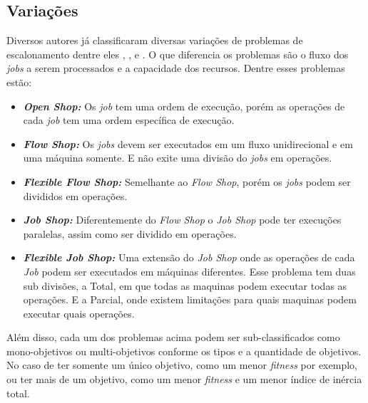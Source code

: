     \subsection{Variações}
        Diversos autores já classificaram diversas variações de problemas de escalonamento dentre eles \cite{graham1979}, \cite{Lenstra1979}, e \cite{maccarthy1993}. O que diferencia os problemas são o fluxo dos \textit{jobs} a serem processados e a capacidade dos recursos. Dentre esses problemas estão:
        \begin{itemize}
            \item \textbf{\textit{Open Shop:}} Os \textit{job} tem uma ordem de execução, porém as operações de cada \textit{job} tem uma ordem específica de execução.
            
            \item \textbf{\textit{Flow Shop:}} Os \textit{jobs} devem ser executados em um fluxo unidirecional e em uma máquina somente. E não exite uma divisão do \textit{jobs} em operações.
            
            \item \textbf{\textit{Flexible Flow Shop:}} Semelhante ao \textit{Flow Shop}, porém os \textit{jobs} podem ser divididos em operações.
            
            \item \textbf{\textit{Job Shop:}} Diferentemente do \textit{Flow Shop} o \textit{Job Shop} pode ter execuções paralelas, assim como ser dividido em operações.
            
            \item \textbf{\textit{Flexible Job Shop:}} Uma extensão do \textit{Job Shop} onde as operações de cada \textit{Job} podem ser executados em máquinas diferentes. Esse problema tem duas sub divisões, a Total, em que todas as maquinas podem executar todas as operações. E a Parcial, onde existem limitações para quais maquinas podem executar quais operações.
        \end{itemize}

        Além disso, cada um dos problemas acima podem ser sub-classificados como mono-objetivos ou multi-objetivos conforme os tipos e a quantidade de objetivos. \newline
        No caso de ter somente um único objetivo, como um menor \textit{fitness} por exemplo, ou ter mais de um objetivo, como um menor \textit{fitness} e um menor índice de inércia total.\newline

